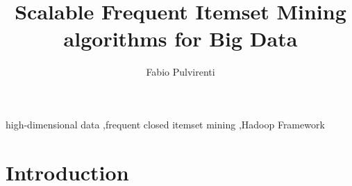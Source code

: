 \documentclass[preprint,review,12pt]{elsarticle}
\begin{document}
\begin{frontmatter}



\title{Scalable Frequent Itemset Mining algorithms for Big Data}


\author[label1]{Fabio Pulvirenti}


\address[label1]{Dipartimento di Automatica e Informatica\\
Politecnico di Torino\\
Torino, Italy\\ Email: name.surname@polito.it}

\begin{abstract}

\end{abstract}

\begin{keyword}
high-dimensional data \sep frequent closed itemset mining \sep Hadoop Framework



\end{keyword}

\end{frontmatter}


\section{Introduction}
\label{Introduction}
\end{document}
